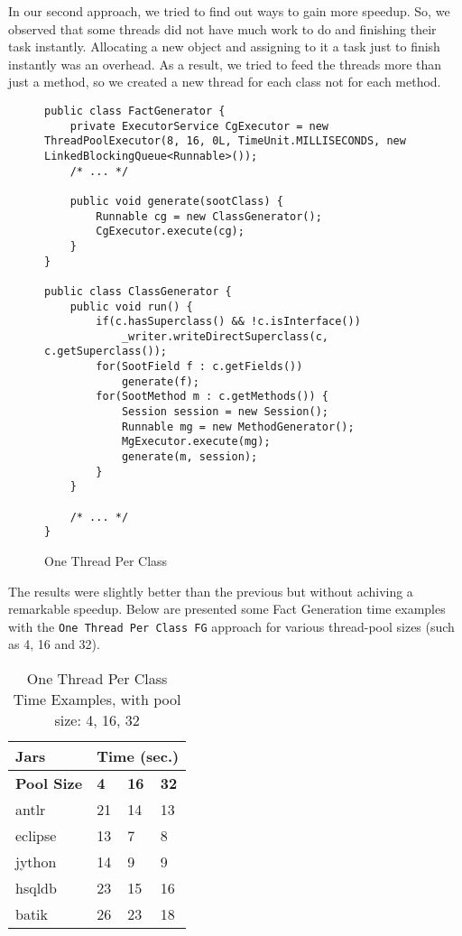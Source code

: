 \documentclass{dithesis}
\begin{document}
        In our second approach, we tried to find out ways to gain more speedup. So, we observed that some threads did not have much work to do and finishing their task instantly. Allocating a new object and assigning to it a task just to finish instantly was an overhead. As a result, we tried to feed the threads more than just a method, so we created a new thread for each class not for each method.
        \begin{figure}[H]
\begin{lstlisting}
public class FactGenerator {
    private ExecutorService CgExecutor = new ThreadPoolExecutor(8, 16, 0L, TimeUnit.MILLISECONDS, new LinkedBlockingQueue<Runnable>());
    /* ... */

    public void generate(sootClass) {
        Runnable cg = new ClassGenerator();
        CgExecutor.execute(cg);
    }
}

public class ClassGenerator {
    public void run() {
        if(c.hasSuperclass() && !c.isInterface())
            _writer.writeDirectSuperclass(c, c.getSuperclass());
        for(SootField f : c.getFields())
            generate(f);
        for(SootMethod m : c.getMethods()) {
            Session session = new Session();
            Runnable mg = new MethodGenerator();
            MgExecutor.execute(mg);
            generate(m, session);
        }
    }

    /* ... */
}
\end{lstlisting}
        \caption{One Thread Per Class}
        \end{figure}

        The results were slightly better than the previous but without achiving a remarkable speedup. Below are presented some Fact Generation time examples with the \texttt{One Thread Per Class FG} approach for various thread-pool sizes (such as 4, 16 and 32).
        \begin{table}[H]
			\centering
            \begin{tabular}{@{}l|lll@{}}
            \toprule
            \textbf{Jars}    	& \multicolumn{3}{l}{\textbf{Time (sec.)}}  \\ \midrule
            \textbf{Pool Size} 	& \textbf{4}  & \textbf{16}  & \textbf{32}  \\ \midrule
            antlr            	& 21          & 14           & 13           \\
            eclipse          	& 13          & 7            & 8            \\
            jython           	& 14          & 9            & 9            \\
            hsqldb           	& 23          & 15           & 16           \\
            batik            	& 26          & 23           & 18           \\ \bottomrule
            \end{tabular}
            \newline
			\caption{One Thread Per Class Time Examples, with pool size: 4, 16, 32}
		\end{table}
\end{document}
